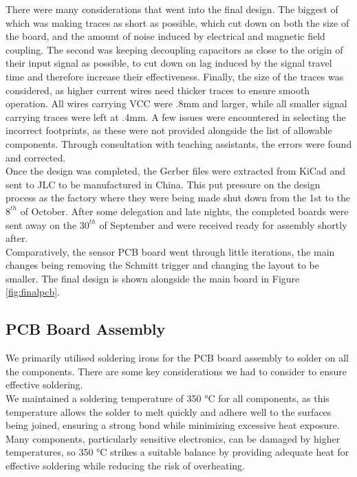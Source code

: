 There were many considerations that went into the final design. The biggest of which was making traces as short as possible, which cut down on both the size of the board, and the amount of noise induced by electrical and magnetic field coupling. The second was keeping decoupling capacitors as close to the origin of their input signal as possible, to cut down on lag induced by the signal travel time and therefore increase their effectiveness. Finally, the size of the traces was considered, as higher current wires need thicker traces to ensure smooth operation. All wires carrying VCC were .8mm and larger, while all smaller signal carrying traces were left at .4mm. A few issues were encountered in selecting the incorrect footprints, as these were not provided alongside the list of allowable components. Through consultation with teaching assistants, the errors were found and corrected. 
\\

Once the design was completed, the Gerber files were extracted from KiCad and sent to JLC to be manufactured in China. This put pressure on the design process as the factory where they were being made shut down from the 1st to the $8^{th}$ of October. After some delegation and late nights, the completed boards were sent away on the $30^{th}$ of September and were received ready for assembly shortly after. 
\\

Comparatively, the sensor PCB board went through little iterations, the main changes being removing the Schmitt trigger and changing the layout to be smaller. The final design is shown alongside the main board in Figure \ref{fig:finalpcb}. 

\subsection{PCB Board Assembly}
We primarily utilised soldering irons for the PCB board assembly to solder on all the components. There are some key considerations we had to consider to ensure effective soldering.  
\\

We maintained a soldering temperature of 350 °C for all components, as this temperature allows the solder to melt quickly and adhere well to the surfaces being joined, ensuring a strong bond while minimizing excessive heat exposure. Many components, particularly sensitive electronics, can be damaged by higher temperatures, so 350 °C strikes a suitable balance by providing adequate heat for effective soldering while reducing the risk of overheating.  
\\

